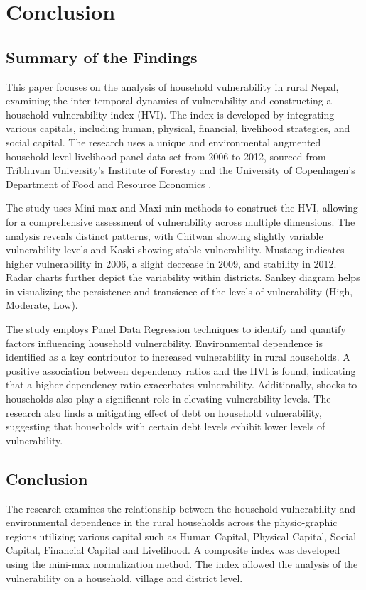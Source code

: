 \section{Conclusion} \label{isect5}
\subsection{Summary of the Findings}
This paper focuses on the analysis of household vulnerability in rural Nepal, examining the inter-temporal dynamics of vulnerability and constructing a household vulnerability index (HVI). The index is developed by integrating various capitals, including human, physical, financial, livelihood strategies, and social capital. The research uses a unique and environmental augmented household-level livelihood panel data-set from 2006 to 2012, sourced from Tribhuvan University’s Institute of Forestry and the University of Copenhagen’s Department of Food and Resource Economics \citep{walelign2022unique}.

The study uses Mini-max and Maxi-min methods to construct the HVI, allowing for a comprehensive assessment of vulnerability across multiple dimensions. The analysis reveals distinct patterns, with Chitwan showing slightly variable vulnerability levels and Kaski showing stable vulnerability. Mustang indicates higher vulnerability in 2006, a slight decrease in 2009, and stability in 2012. Radar charts further depict the variability within districts. Sankey diagram helps in visualizing the persistence and transience of the levels of vulnerability (High, Moderate, Low). 

The study employs Panel Data Regression techniques to identify and quantify factors influencing household vulnerability. Environmental dependence is identified as a key contributor to increased vulnerability in rural households. A positive association between dependency ratios and the HVI is found, indicating that a higher dependency ratio exacerbates vulnerability. Additionally, shocks to households also play a significant role in elevating vulnerability levels. The research also finds a mitigating effect of debt on household vulnerability, suggesting that households with certain debt levels exhibit lower levels of vulnerability. 

\subsection{Conclusion}
The research examines the relationship between the household vulnerability and environmental dependence in the rural households across the physio-graphic regions utilizing various capital such as Human Capital, Physical Capital, Social Capital, Financial Capital and Livelihood. A composite index was developed using the mini-max normalization method. The index allowed the analysis of the vulnerability on a household, village and district level. 

